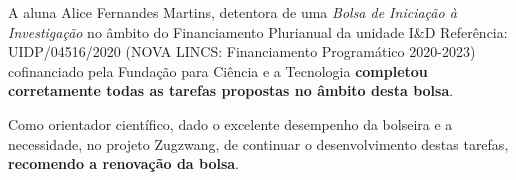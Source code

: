 \documentclass{oficio}
\begin{document}
\unidade{\textsc{\DI}}


A aluna 
%
Alice Fernandes Martins, 
%
detentora de uma \emph{Bolsa de Iniciação à Investigação} no âmbito do Financiamento Plurianual da unidade I\&D Referência: UIDP/04516/2020 (NOVA LINCS: Financiamento Programático 2020-2023) cofinanciado pela Fundação para Ciência e a Tecnologia
%
\textbf{completou corretamente todas as tarefas propostas no âmbito desta bolsa}.
%

%
Como orientador científico, 
%
dado o excelente desempenho da bolseira e a necessidade, no projeto Zugzwang, de continuar o desenvolvimento destas tarefas, \textbf{recomendo a renovação da bolsa}.

\end{document}
